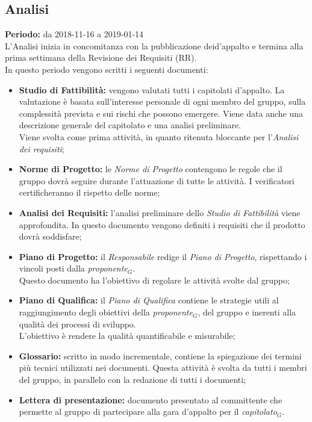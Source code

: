 \begin{flushleft}
\section{Analisi}\label{Analisi}
\textbf{Periodo:} da 2018-11-16 a 2019-01-14\\L'Analisi inizia in concomitanza con la pubblicazione deid’appalto e termina alla prima settimana della  Revisione dei Requisiti (RR).\\
In questo periodo vengono scritti i seguenti documenti:
\begin{itemize}
    \item \textbf{Studio di Fattibilità:} vengono valutati tutti i capitolati d'appalto. La valutazione è basata sull'interesse personale di ogni membro del gruppo, sulla complessità prevista e sui rischi che possono emergere. Viene data anche una descrizione generale del capitolato e una analisi preliminare.\\Viene svolta come prima attività, in quanto ritenuta bloccante per l'\textit{Analisi dei requisiti};
    \item \textbf{Norme di Progetto:} le \textit{Norme di Progetto} contengono le regole che il gruppo dovrà seguire durante l'attuazione di tutte le attività. I verificatori certificheranno il rispetto delle norme;
    \item \textbf{Analisi dei Requisiti:} l'analisi preliminare dello \textit{Studio di Fattibilità} viene approfondita.
    In questo documento vengono definiti i requisiti che il prodotto dovrà soddisfare;
    \item \textbf{Piano di Progetto:} il \textit{Responsabile} redige il \textit{Piano di Progetto}, rispettando i vincoli posti dalla \textit{proponente$_{G}$}.\\Questo documento ha l'obiettivo di regolare le attività svolte dal gruppo;
    \item \textbf{Piano di Qualifica:} il \textit{Piano di Qualifica} contiene le strategie utili al raggiungimento degli obiettivi della \textit{proponente$_{G}$}, del gruppo e inerenti alla qualità dei processi di sviluppo.\\L'obiettivo è rendere la qualità quantificabile e misurabile;
    \item \textbf{Glossario:} scritto in modo incrementale, contiene la spiegazione dei termini più tecnici utilizzati nei documenti. Questa attività è svolta da tutti i membri del gruppo, in parallelo con la redazione di tutti i documenti;
    \item \textbf{Lettera di presentazione:} documento presentato al committente che permette al gruppo di partecipare alla gara d’appalto per il \textit{capitolato$_{G}$}.

\end{itemize}
\end{flushleft}
